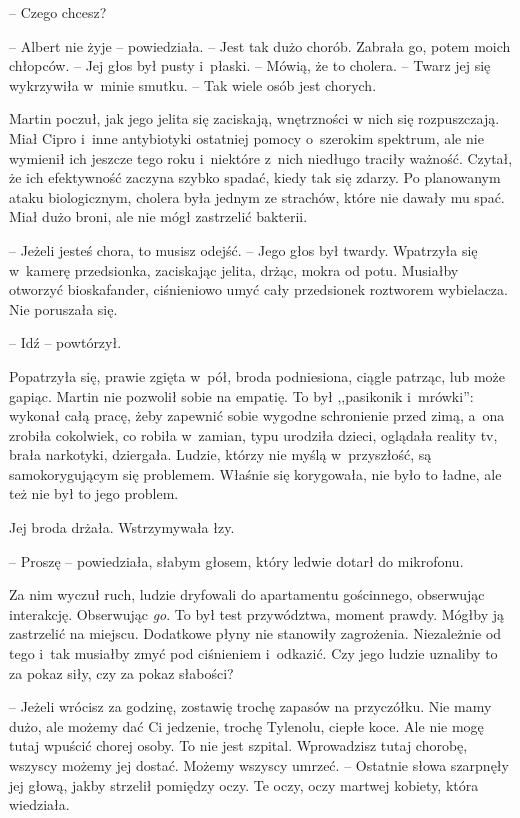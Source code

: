 \documentclass[oneside,polish,11pt,sfheadings]{mwbk}
\begin{document}
-- Czego chcesz?

-- Albert nie żyje -- powiedziała. -- Jest tak dużo chorób. Zabrała go,
potem moich chłopców. -- Jej głos był pusty i~płaski. -- Mówią, że to
cholera. -- Twarz jej się wykrzywiła w~minie smutku. -- Tak wiele osób
jest chorych.

Martin poczuł, jak jego jelita się zaciskają, wnętrzności w nich się
rozpuszczają. Miał Cipro i~inne antybiotyki ostatniej pomocy o~szerokim
spektrum, ale nie wymienił ich jeszcze tego roku i~niektóre z~nich
niedługo traciły ważność. Czytał, że ich efektywność zaczyna szybko
spadać, kiedy tak się zdarzy. Po planowanym ataku biologicznym, cholera
była jednym ze strachów, które nie dawały mu spać. Miał dużo broni, ale
nie mógł zastrzelić bakterii.

-- Jeżeli jesteś chora, to musisz odejść. -- Jego głos był twardy.
Wpatrzyła się w~kamerę przedsionka, zaciskając jelita, drżąc, mokra od
potu. Musiałby otworzyć bioskafander, ciśnieniowo umyć cały przedsionek
roztworem wybielacza. Nie poruszała się. 

-- Idź -- powtórzył.

Popatrzyła się, prawie zgięta w~pół, broda podniesiona, ciągle patrząc,
lub może gapiąc. Martin nie pozwolił sobie na empatię. To był
,,pasikonik i~mrówki'': wykonał całą pracę, żeby zapewnić sobie wygodne
schronienie przed zimą, a~ona zrobiła cokolwiek, co robiła w~zamian,
typu urodziła dzieci, oglądała reality tv, brała narkotyki, dziergała.
Ludzie, którzy nie myślą w~przyszłość, są samokorygującym się problemem.
Właśnie się korygowała, nie było to ładne, ale też nie był to jego
problem.

Jej broda drżała. Wstrzymywała łzy. 

-- Proszę -- powiedziała, słabym głosem, który ledwie dotarł do mikrofonu.

Za nim wyczuł ruch, ludzie dryfowali do apartamentu gościnnego,
obserwując interakcję. Obserwując \textit{go}. To był test przywództwa,
moment prawdy. Mógłby ją zastrzelić na miejscu. Dodatkowe płyny nie
stanowiły zagrożenia. Niezależnie od tego i~tak musiałby zmyć pod
ciśnieniem i~odkazić. Czy jego ludzie uznaliby to za pokaz siły, czy za
pokaz słabości?

-- Jeżeli wrócisz za godzinę, zostawię trochę zapasów na przyczółku. Nie
mamy dużo, ale możemy dać Ci jedzenie, trochę Tylenolu, ciepłe koce. Ale
nie mogę tutaj wpuścić chorej osoby. To nie jest szpital. Wprowadzisz
tutaj chorobę, wszyscy możemy jej dostać. Możemy wszyscy umrzeć. -- Ostatnie słowa szarpnęły jej głową, jakby strzelił pomiędzy oczy. Te
oczy, oczy martwej kobiety, która wiedziała.
\end{document}
